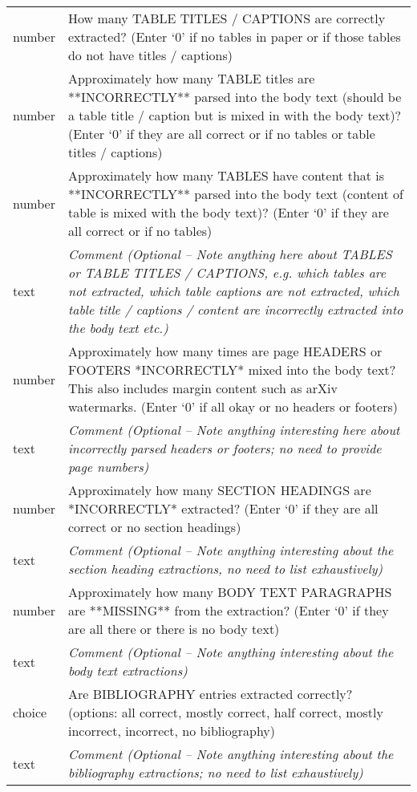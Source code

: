 \begin{table}[h!]
\begin{tabular}{lp{130mm}}
    number & How many TABLE TITLES / CAPTIONS are correctly extracted? (Enter `0' if no tables in paper or if those tables do not have titles / captions) \\
    number & Approximately how many TABLE titles are **INCORRECTLY** parsed into the body text (should be a table title / caption but is mixed in with the body text)? (Enter `0' if they are all correct or if no tables or table titles / captions) \\
    number & Approximately how many TABLES have content that is **INCORRECTLY** parsed into the body text (content of table is mixed with the body text)? (Enter `0' if they are all correct or if no tables) \\
    text & \textit{Comment (Optional -- Note anything here about TABLES or TABLE TITLES / CAPTIONS, e.g. which tables are not extracted, which table captions are not extracted, which table title / captions / content are incorrectly extracted into the body text etc.)} \\
    \midrule
    number & Approximately how many times are page HEADERS or FOOTERS *INCORRECTLY* mixed into the body text?This also includes margin content such as arXiv watermarks. (Enter `0' if all okay or no headers or footers) \\
    text & \textit{Comment (Optional -- Note anything interesting here about incorrectly parsed headers or footers; no need to provide page numbers)} \\
    \midrule
    number & Approximately how many SECTION HEADINGS are *INCORRECTLY* extracted?  (Enter `0' if they are all correct or no section headings) \\
    text & \textit{Comment (Optional -- Note anything interesting about the section heading extractions, no need to list exhaustively)} \\
    \midrule
    number & Approximately how many BODY TEXT PARAGRAPHS are **MISSING** from the extraction?  (Enter `0' if they are all there or there is no body text) \\ 
    text & \textit{Comment (Optional -- Note anything interesting about the body text extractions)} \\
    \midrule 
    choice & Are BIBLIOGRAPHY entries extracted correctly? (options: all correct, mostly correct, half correct, mostly incorrect, incorrect, no bibliography)  \\
    text & \textit{Comment (Optional -- Note anything interesting about the bibliography extractions; no need to list exhaustively)} \\

\end{tabular}
\end{table}
